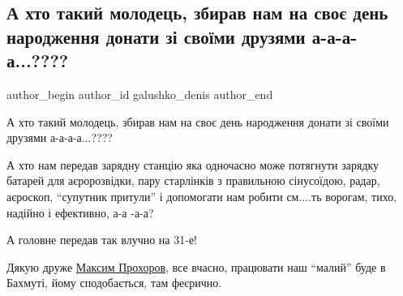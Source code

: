  
 
 
 
 

\subsection{А хто такий молодець, збирав нам на своє день народження донати зі своїми друзями а-а-а-а...????}
\label{sec:31_12_2022.fb.galushko_denis.2.a_khto_takii_molodet}

\ifcmt
 author_begin
   author_id galushko_denis
 author_end
\fi

А хто такий молодець, збирав нам на своє день народження донати зі своїми
друзями а-а-а-а...???? 

А хто нам передав зарядну станцію яка одночасно може потягнути зарядку батарей
для аєророзвідки, пару старлінків з правильною сінусоїдою, радар, аєроскоп,
\enquote{супутник притули} і допомогати нам робити см....ть ворогам, тихо,
надійно і ефективно,   а-а -а-а? 

А головне передав так влучно на 31-е!

Дякую друже \href{https://www.facebook.com/prokhorrov}{Максим Прохоров}, все
вчасно, працювати наш \enquote{малий} буде в Бахмуті, йому сподобається, там
феєрично.
